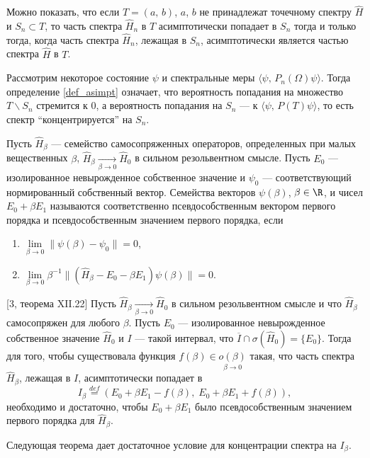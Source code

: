 \documentclass[a4paper
]{article}
\begin{document}
Можно показать, что если $T=(a, \, b)$, $a$, $b$ не принадлежат точечному
спектру $\hat H$ и $S_n\subset T$, то часть спектра $\hat H_n$ в $T$
асимптотически попадает в $S_n$ тогда и только тогда, когда часть спектра
$\hat H_n$, лежащая в $S_n$, асимптотически является частью спектра $\hat
H$ в $T$. \par
Рассмотрим некоторое состояние $\psi$ и спектральные меры $\langle
\psi, \, P_n(\Omega)\psi\rangle$. Тогда определение \ref{def_asimpt} означает,
что вероятность попадания на множество $T\backslash S_n$ стремится к 0,
а вероятность попадания на $S_n$ --- к $\langle \psi, \, P(T)\psi\rangle$,
то есть спектр ``концентрируется'' на $S_n$.
\begin{Def}
Пусть $\hat H_\beta$ --- семейство самосопряженных операторов, определенных
при малых вещественных $\beta$, $\hat H_\beta\underset{\beta\rightarrow 0}
{\rightarrow} \hat H_0$ в сильном резольвентном смысле. Пусть $E_0$ ---
изолированное невырожденное собственное значение и $\psi_0$ ---
соответствующий нормированный собственный вектор. Семейства векторов
$\psi(\beta)$, $\beta\in \R$, и чисел $E_0+\beta E_1$ называются
соответственно псевдособственным вектором первого порядка и псевдособственным
значением первого порядка, если
\begin{enumerate}
\item $\lim \limits_{\beta\rightarrow 0}\|\psi(\beta)-\psi_0\|=0$,
\item $\lim \limits_{\beta\rightarrow 0} \beta^{-1}\|(\hat H_\beta-
E_0-\beta E_1)\psi(\beta)\|=0$.
\end{enumerate}
\end{Def}
\begin{Trm}
{\rm [3, теорема XII.22]}
Пусть $\hat H_\beta\underset{\beta\rightarrow 0}{\rightarrow} \hat H_0$ в сильном
резольвентном смысле и что $\hat H_\beta$ самосопряжен для любого $\beta$.
Пусть $E_0$ --- изолированное невырожденное собственное значение $\hat
H_0$ и $I$ --- такой интервал, что $\overline I\cap \sigma(\hat H_0)
=\{E_0\}$. Тогда для того, чтобы существовала функция $f(\beta)\in
\underset{\beta\rightarrow 0}{o(\beta)}$ такая, что часть спектра $\hat H_\beta$,
лежащая в $I$, асимптотически попадает в $$I_\beta\stackrel{def}{=}
(E_0+\beta E_1-f(\beta), \; E_0+\beta E_1+f(\beta)),$$ необходимо и достаточно,
чтобы $E_0+\beta E_1$ было псевдособственным значением первого порядка
для $\hat H_\beta$.
\end{Trm}
Следующая теорема дает достаточное условие для концентрации спектра на
$I_\beta$.
\end{document}
